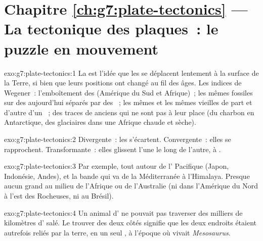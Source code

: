 \section*{Chapitre \ref{ch:g7:plate-tectonics} --- La tectonique des plaques~: le puzzle en mouvement}

\begin{solution}{exo:g7:plate-tectonics:1}
La  est l'idée que les  se déplacent
lentement à la surface de la Terre, si bien que leurs positions ont changé
au fil des âges. Les indices de Wegener~: l'emboîtement des 
(Amérique du Sud et Afrique)~; les mêmes fossiles sur des 
aujourd'hui séparés par des ~; les mêmes  et les mêmes vieilles
 de part et d'autre d'un ~; des traces de 
anciens qui ne sont pas à leur place (du charbon en Antarctique, des
 glaciaires dans une Afrique chaude et sèche).
\end{solution}

\begin{solution}{exo:g7:plate-tectonics:2}
Divergente~: les  s'écartent. Convergente~: elles se rapprochent.
Transformante~: elles glissent l'une le long de l'autre,  à .
\end{solution}

\begin{solution}{exo:g7:plate-tectonics:3}
Par exemple, tout autour de l' Pacifique (Japon, Indonésie, Andes), et
la bande qui va de la Méditerranée à l'Himalaya. Presque aucun grand 
au milieu de l'Afrique ou de l'Australie (ni dans l'Amérique du Nord à
l'est des Rocheuses, ni au Brésil).
\end{solution}

\begin{solution}{exo:g7:plate-tectonics:4}
Un animal d' ne pouvait pas traverser des milliers de kilomètres
d' salé. Le trouver des deux côtés signifie que les deux endroits
étaient autrefois reliés par la terre, en un seul , à l'époque où
vivait \emph{Mesosaurus}.
\end{solution}

